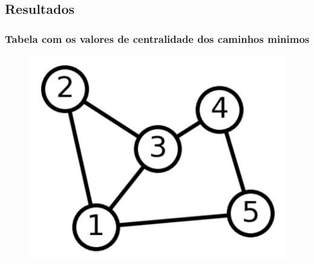 \documentclass{beamer}
\begin{document}
    \subsection{Resultados}
        \begin{frame}
            \frametitle{Tabela com os valores de centralidade dos caminhos minimos}
            \begin{minipage}{\textwidth}
                \begin{minipage}[b]{0.49\textwidth}
                    \begin{figure}
                        \centering
                        \includegraphics[scale=0.3]{simple-graph.png}
                    \end{figure}
                \end{minipage}
                \hfill
                \begin{minipage}[b]{0.49\textwidth}
                    \centering
\end{minipage}
\end{minipage}
\end{frame}
\end{document}
